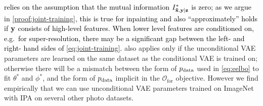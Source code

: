\textcolor{black}{ relies on the assumption that
  the mutual information $I^*_{\mathbf{\tilde{x}}{},\mathbf{y}{}|\mathbf{z}{}}{}$ is zero; as we argue in
  \cref{proof:joint-training}, this is true for inpainting and also
  ``approximately'' holds if $\mathbf{y}{}$ consists of high-level features. When
  lower level features are conditioned on, e.g.~for super-resolution, there may
  be a significant gap between the left- and right- hand sides of
  \cref{eq:joint-training}. }  also applies only if
the unconditional VAE parameters are learned on the same dataset as the
conditional VAE is trained on; otherwise there will be a mismatch between the
form of $p_{\rm{data}}{}$ used in \cref{eq:eelbo} to fit $\theta^*$ and $\phi^*$, and
the form of $p_{\rm{data}}{}$ implicit in the $\mathcal{O}_\mathrm{for}$ objective.
However we find empirically that we can use unconditional VAE parameters trained
on ImageNet~\citep{deng2009imagenet} with IPA on several other photo datasets.

